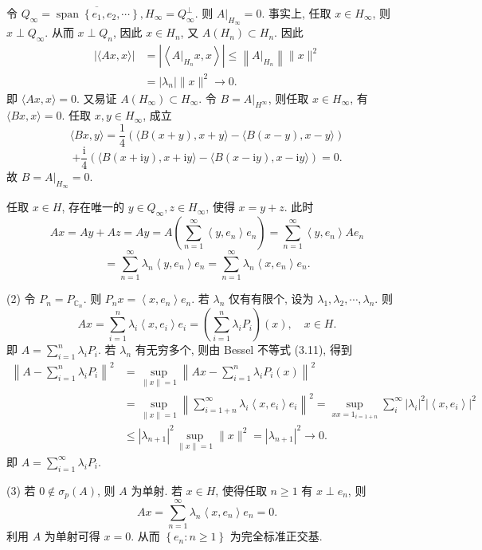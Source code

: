\documentclass[openany]{ctexbook}
\makeatletter
\theoremstyle{kaiti}
\theoremstyle{normal}
\renewenvironment{proof}[1][\proofname]{\par
    \pushQED{\qed}%
    \normalfont \topsep6\p@\@plus6\p@\relax
    \trivlist
    \item\relax
    {\heiti #1}\hspace{2\labelsep}\ignorespaces
  }{%
    \popQED\endtrivlist\@endpefalse
  }
\makeatother
\begin{document}
\begin{proof}
令 $Q_{\infty}=\overline{\operatorname{span}\left\{e_1, e_2, \cdots\right\}}, H_{\infty}=Q_{\infty}^{\perp}$. 则 $\left.A\right|_{H_{\infty}}=0$. 事实上, 任取 $x \in H_{\infty}$, 则 $x \perp Q_{\infty}$. 从而 $x \perp Q_n$, 因此 $x \in H_n$, 又 $A\left(H_n\right) \subset H_n$. 因此
$$
\begin{aligned}
|\langle A x, x\rangle| &=\left|\left\langle\left. A\right|_{H_n} x, x\right\rangle\right| \leqslant\left\|\left.A\right|_{H_n}\right\|\|x\|^2 \\
&=\left|\lambda_n\right|\|x\|^2 \rightarrow 0.
\end{aligned}
$$
即 $\langle A x, x\rangle=0$. 又易证 $A\left(H_{\infty}\right) \subset H_{\infty}$. 令 $B=\left.A\right|_{H^{\infty}}$, 则任取 $x \in H_{\infty}$, 有 $\langle B x, x\rangle=0$.
任取 $x, y \in H_{\infty}$, 成立
$$
\langle B x, y\rangle=\frac{1}{4}(\langle B(x+y), x+y\rangle-\langle B(x-y), x-y\rangle)
$$
$$
+\frac{\mathrm{i}}{4}(\langle B(x+\mathrm{i} y), x+\mathrm{i} y\rangle-\langle B(x-\mathrm{i} y), x-\mathrm{i} y\rangle)=0.
$$
故 $B=\left.A\right|_{H_{\infty}}=0$.

任取 $x \in H$, 存在唯一的 $y \in Q_{\infty}, z \in H_{\infty}$, 使得 $x=y+z$. 此时
$$
A x=A y+A z=A y=A\left(\sum_{n=1}^{\infty}\left\langle y, e_n\right\rangle e_n\right)=\sum_{n=1}^{\infty}\left\langle y, e_n\right\rangle A e_n
$$
$$
=\sum_{n=1}^{\infty} \lambda_n\left\langle y, e_n\right\rangle e_n=\sum_{n=1}^{\infty} \lambda_n\left\langle x, e_n\right\rangle e_n.
$$

(2) 令 $P_n=P_{\mathbb{C}_n}$. 则 $P_n x=\left\langle x, e_n\right\rangle e_n$. 若 $\lambda_n$ 仅有有限个, 设为 $\lambda_1, \lambda_2, \cdots, \lambda_n$. 则
$$
A x=\sum_{i=1}^n \lambda_{i}\left\langle x, e_{i}\right\rangle e_{i}=\left(\sum_{i=1}^n \lambda_{i} P_{i}\right)(x), \quad x \in H.
$$
即 $A=\sum_{i=1}^n \lambda_{i} P_{i}$.
若 $\lambda_n$ 有无穷多个, 则由 Bessel 不等式 (3.11), 得到
$$
\begin{aligned}
\left\|A-\sum_{i=1}^n \lambda_{i} P_{i}\right\|^2 &=\sup_{\|x\|=1}\left\|A x-\sum_{i=1}^n \lambda_{i} P_{i}(x)\right\|^2 \\
&=\sup_{\|x\|=1}\left\|\sum_{i=1+n}^{\infty} \lambda_{i}\left\langle x, e_{i}\right\rangle e_{i}\right\|^2=\sup_{x x=1_{i=1+n}} \sum_{i}^{\infty}\left|\lambda_{i}\right|^2\left|\left\langle x, e_{i}\right\rangle\right|^2 \\
& \leqslant\left|\lambda_{n+1}\right|^2 \sup_{\|x\|=1}\|x\|^2=\left|\lambda_{n+1}\right|^2 \rightarrow 0.
\end{aligned}
$$
即 $A=\sum_{i=1}^{\infty} \lambda_{i} P_{i}$.

(3) 若 $0 \notin \sigma_{p}(A)$, 则 $A$ 为单射. 若 $x \in H$, 使得任取 $n \geqslant 1$ 有 $x \perp e_n$, 则
$$
A x=\sum_{n=1}^{\infty} \lambda_n\left\langle x, e_n\right\rangle e_n=0.
$$
利用 $A$ 为单射可得 $x=0$. 从而 $\left\{e_n: n \geqslant 1\right\}$ 为完全标准正交基.
\end{proof}
\end{document}

